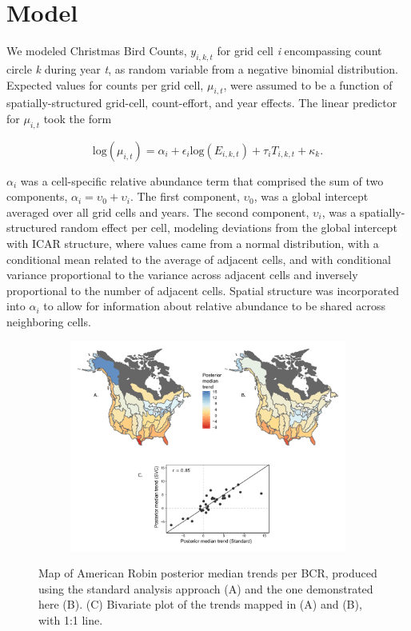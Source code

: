 \documentclass[]{article}
\begin{document}
\section{Model}
We modeled Christmas Bird Counts, $y_{i,k,t}$ for grid cell \textit{i} encompassing count circle \textit{k} during year \textit{t}, as random variable from a negative binomial distribution. Expected values for counts per grid cell, $\mu_{i,t}$, were assumed to be a function of spatially-structured grid-cell, count-effort, and year effects. The linear predictor for $\mu_{i,t}$ took the form

$$\text{log}(\mu_{i,t}) = \alpha _{i} + \epsilon_{i} \text{log}(E_{i,k,t}) + \tau_{i}T_{i,k,t} + \kappa_{k}.$$

$\alpha_i$ was a cell-specific relative abundance term that comprised the sum of two components, $\alpha_i = \upsilon_0 + \upsilon_i$. The first component, $\upsilon_0$, was a global intercept averaged over all grid cells and years. The second component, $\upsilon_i$, was a spatially-structured random effect per cell, modeling deviations from the global intercept with ICAR structure, where values came from a normal distribution, with a conditional mean related to the average of adjacent cells, and with conditional variance proportional to the variance across adjacent cells and inversely proportional to the number of adjacent cells. Spatial structure was incorporated into $\alpha_i$ to allow for information about relative abundance to be shared across neighboring cells.

\begin{figure}[t]
  \centering
  \begin{subfigure}[t]{0.99\textwidth}
    \centering
    \includegraphics[width=\textwidth]{bcr_comparison} 
  \end{subfigure}
  \caption{Map of American Robin posterior median trends per BCR, produced using the standard analysis approach (A) and the one demonstrated here (B). (C) Bivariate plot of the trends mapped in (A) and (B), with 1:1 line.}
\end{figure}
\end{document}
